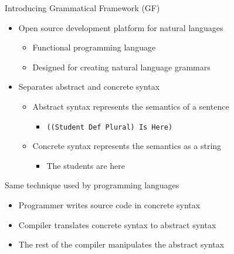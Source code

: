 \begin{frame}{Introducing Grammatical Framework (GF)} 
         \begin{itemize}
           \item Open source development platform for natural languages \pause
           \begin{itemize}
              \item Functional programming language \pause
              \item Designed for creating natural language grammars
           \end{itemize}\pause
           \item Separates abstract and concrete syntax \pause
           \begin{itemize}
              \item Abstract syntax represents the semantics of a sentence \pause
              \begin{itemize} \item[] \texttt{((Student Def Plural) Is Here)}\pause \end{itemize}
              \item Concrete syntax represents the semantics as a string\pause 
              \begin{itemize} \item[] The students are here \end{itemize}
           \end{itemize}\pause
         \end{itemize}
         
           \begin{block}{Same technique used by programming languages}
             \begin{itemize}
               \item Programmer writes source code in concrete syntax \pause
               \item Compiler translates concrete syntax to abstract syntax \pause
               \item The rest of the compiler manipulates the abstract syntax
             \end{itemize}
         \end{block}
         
\end{frame}

